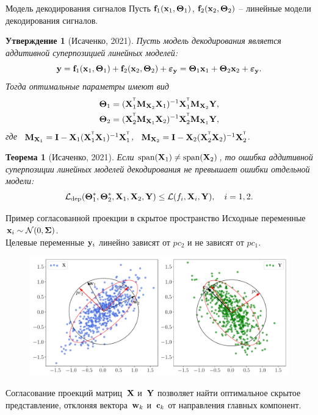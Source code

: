 \documentclass[10pt]{beamer}
\newtheorem{statement}{Утверждение}
\newtheorem{rustheorem}{Теорема}
\begin{document}
\begin{frame}{Модель декодирования сигналов}
	Пусть $\mathbf{f}_1(\mathbf{x}_1, \boldsymbol{\Theta}_1)$, $\mathbf{f}_2(\mathbf{x}_2, \boldsymbol{\Theta}_2)$ -- линейные модели декодирования сигналов. 
	\begin{statement}[Исаченко, 2021]
		Пусть модель декодирования является аддитивной суперпозицией линейных моделей:
		\[
			\mathbf{y} = \mathbf{f}_1(\mathbf{x}_1, \boldsymbol{\Theta}_1) + \mathbf{f}_2(\mathbf{x}_2, \boldsymbol{\Theta}_2) + \boldsymbol{\varepsilon}_{\mathbf{y}} = \boldsymbol{\Theta}_1 \mathbf{x}_1 + \boldsymbol{\Theta}_2 \mathbf{x}_2 + \boldsymbol{\varepsilon}_{\mathbf{y}}.
		\]
		Тогда оптимальные параметры имеют вид
		\vspace{-0.2cm}
		\begin{align*}
			\boldsymbol{\Theta}_1 &= (\mathbf{X}_1^{^{\text{\tiny\sffamily\upshape\mdseries T}}} \mathbf{M}_{\mathbf{X}_2} \mathbf{X}_1)^{-1} \mathbf{X}_1^{^{\text{\tiny\sffamily\upshape\mdseries T}}} \mathbf{M}_{\mathbf{X}_2} \mathbf{Y}, \\
			\boldsymbol{\Theta}_2 &= (\mathbf{X}_2^{^{\text{\tiny\sffamily\upshape\mdseries T}}} \mathbf{M}_{\mathbf{X}_1} \mathbf{X}_2)^{-1} \mathbf{X}_2^{^{\text{\tiny\sffamily\upshape\mdseries T}}} \mathbf{M}_{\mathbf{X}_1} \mathbf{Y},
		\end{align*}
		где \, $\mathbf{M}_{\mathbf{X}_1} = \mathbf{I} - \mathbf{X}_1 (\mathbf{X}_1^{^{\text{\tiny\sffamily\upshape\mdseries T}}} \mathbf{X}_1)^{-1} \mathbf{X}_1^{^{\text{\tiny\sffamily\upshape\mdseries T}}}$, \, $\mathbf{M}_{\mathbf{X}_2} = \mathbf{I} -\mathbf{X}_2 (\mathbf{X}_2^{^{\text{\tiny\sffamily\upshape\mdseries T}}} \mathbf{X}_2)^{-1} \mathbf{X}_2^{^{\text{\tiny\sffamily\upshape\mdseries T}}}$.
	\end{statement}
	\begin{rustheorem}[Исаченко, 2021]
		Если $\text{span}(\mathbf{X}_1) \neq \text{span}(\mathbf{X}_2)$, то ошибка аддитивной суперпозиции линейных моделей декодирования не превышает ошибки отдельной модели:
		\[
			\mathcal{L}_{\textnormal{dep}}(\boldsymbol{\Theta}_1^*, \boldsymbol{\Theta}_2^*, \mathbf{X}_1, \mathbf{X}_2, \mathbf{Y}) \leq \mathcal{L}(f_i, \mathbf{X}_i, \mathbf{Y}), \quad i = 1, 2.
		\]
	\end{rustheorem}
\end{frame}
\begin{frame}{Пример согласованной проекции в скрытое пространство}
	Исходные переменные $\mathbf{x}_i \sim \mathcal{N}(0, \mathbf{\Sigma})$. \\ 
	Целевые переменные $\mathbf{y}_i$ линейно зависят от $pc_2$ и не зависят от $pc_1$.
	\begin{figure}[h]
	\centering
	\includegraphics[width=\linewidth]{figs/pls_toy_example}
	\end{figure}
	Согласование проекций матриц~$\mathbf{X}$ и~$\mathbf{Y}$ позволяет найти оптимальное скрытое представление, отклоняя вектора~$\mathbf{w}_k$ и~$\mathbf{c}_k$ от направления главных компонент. 
\end{frame}
\end{document}
